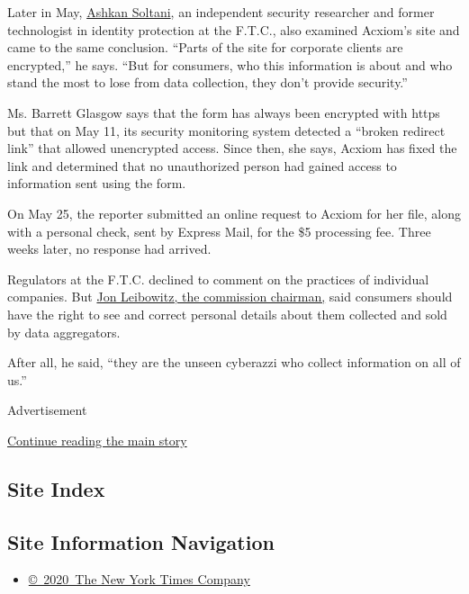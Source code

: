 Later in May, \href{http://www.ashkansoltani.org/}{Ashkan Soltani}, an
independent security researcher and former technologist in identity
protection at the F.T.C., also examined Acxiom's site and came to the
same conclusion. ``Parts of the site for corporate clients are
encrypted,'' he says. ``But for consumers, who this information is about
and who stand the most to lose from data collection, they don't provide
security.''

Ms. Barrett Glasgow says that the form has always been encrypted with
https but that on May 11, its security monitoring system detected a
``broken redirect link'' that allowed unencrypted access. Since then,
she says, Acxiom has fixed the link and determined that no unauthorized
person had gained access to information sent using the form.

On May 25, the reporter submitted an online request to Acxiom for her
file, along with a personal check, sent by Express Mail, for the \$5
processing fee. Three weeks later, no response had arrived.

Regulators at the F.T.C. declined to comment on the practices of
individual companies. But
\href{http://www.ftc.gov/commissioners/leibowitz/index.shtml}{Jon
Leibowitz, the commission chairman,} said consumers should have the
right to see and correct personal details about them collected and sold
by data aggregators.

After all, he said, ``they are the unseen cyberazzi who collect
information on all of us.''

Advertisement

\protect\hyperlink{after-bottom}{Continue reading the main story}

\hypertarget{site-index}{%
\subsection{Site Index}\label{site-index}}

\hypertarget{site-information-navigation}{%
\subsection{Site Information
Navigation}\label{site-information-navigation}}

\begin{itemize}
\tightlist
\item
  \href{https://help.nytimes3xbfgragh.onion/hc/en-us/articles/115014792127-Copyright-notice}{©~2020~The
  New York Times Company}
\end{itemize}

